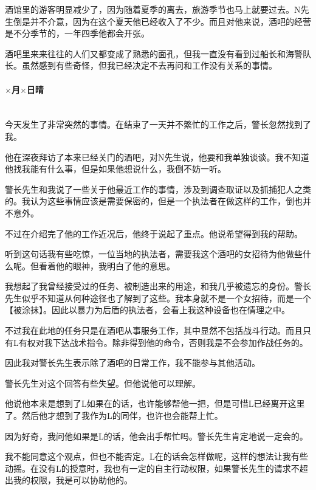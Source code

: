 酒馆里的游客明显减少了，因为随着夏季的离去，旅游季节也马上就要过去。N先生倒是并不介意，因为在这个夏天他已经收入了不少。而且对他来说，酒吧的经营是不分季节的，一年四季他都会开张。

酒吧里来来往往的人们又都变成了熟悉的面孔，但我一直没有看到过船长和海警队长。虽然感到有些奇怪，但我已经决定不去再问和工作没有关系的事情。

\par

\paragraph*{$\times$月$\times$日\quad 晴}\mbox{}\\

今天发生了非常突然的事情。在结束了一天并不繁忙的工作之后，警长忽然找到了我。

他在深夜拜访了本来已经关门的酒吧，对N先生说，他要和我单独谈谈。我不知道他找我能有什么事，但是如果他想说什么，我倒不妨一听。

警长先生和我说了一些关于他最近工作的事情，涉及到调查取证以及抓捕犯人之类的。我认为这些事情应该是需要保密的，但是一个执法者在做这样的工作，倒也并不意外。

不过在介绍完了他的工作近况后，他终于说起了重点。他说希望得到我的帮助。

听到这句话我有些吃惊，一位当地的执法者，需要我这个酒吧的女招待为他做些什么呢。但看着他的眼神，我明白了他的意思。

我想起了我曾经接受过的任务、被制造出来的用途，和我几乎被遗忘的身份。警长先生似乎不知道从何种途径也了解到了这些。我本身就不是一个女招待，而是一个【被涂抹】。因此以暴力为后盾的执法者，会看上我这种设备也在情理之中。

不过我在此地的任务只是在酒吧从事服务工作，其中显然不包括战斗行动。而且只有L有权对我下达战术指令。除非得到他的命令，否则我是不会参加作战任务的。

因此我对警长先生表示除了酒吧的日常工作，我不能参与其他活动。

警长先生对这个回答有些失望。但他说他可以理解。

他说他本来是想到了L如果在的话，也许能够帮他一把，但是可惜L已经离开这里了。然后他才想到了我作为L的同伴，也许也会能帮上忙。

因为好奇，我问他如果是L的话，他会出手帮忙吗。警长先生肯定地说一定会的。

我不能同意这个观点，但也不能否定。L在的话会怎样做呢，这样的想法让我有些动摇。在没有L的授意时，我也有一定的自主行动权限，如果警长先生的请求不超出我的权限，我是可以协助他的。

